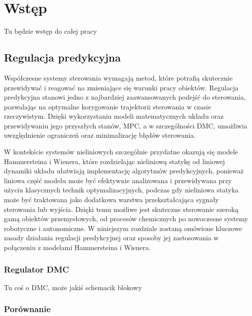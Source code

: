 \documentclass[a4paper,titlepage,11pt,floatssmall]{mwrep}
\begin{document}
\chapter{Wstęp}
Tu będzie wstęp do całej pracy











\section{Regulacja predykcyjna}
Współczesne systemy sterowania wymagają metod, które potrafią skutecznie przewidywać i reagować na zmieniające się warunki pracy obiektów. Regulacja predykcyjna stanowi jedno z najbardziej zaawansowanych podejść do sterowania, pozwalając na optymalne korygowanie trajektorii sterowania w czasie rzeczywistym. Dzięki wykorzystaniu modeli matematycznych układu oraz przewidywaniu jego przyszłych stanów, MPC, a w szczególności DMC, umożliwia uwzględnienie ograniczeń oraz minimalizację błędów sterowania.

W kontekście systemów nieliniowych szczególnie przydatne okazują się modele Hammersteina i Wienera, które rozdzielając nieliniową statykę od liniowej dynamiki układu ułatwiają implementację algorytmów predykcyjnych, ponieważ liniowa część modelu może być efektywnie analizowana i przewidywana przy użyciu klasycznych technik optymalizacyjnych, podczas gdy nieliniowa statyka może być traktowana jako dodatkowa warstwa przekształcająca sygnały sterowania lub wyjścia. Dzięki temu możliwe jest skuteczne sterowanie szeroką gamą obiektów przemysłowych, od procesów chemicznych po nowoczesne systemy robotyczne i autonomiczne. W niniejszym rozdziale zostaną omówione kluczowe zasady działania regulacji predykcyjnej oraz sposoby jej zastosowania w połączeniu z modelami Hammersteina i Wienera.

\subsection{Regulator DMC}
Tu coś o DMC, może jakiś schemacik blokowy

\newpage

 
\subsection{Porównanie}
\end{document}
